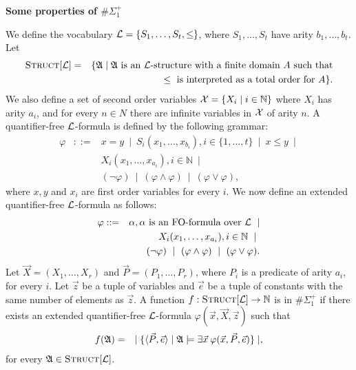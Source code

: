 \documentclass[12pt]{article}
\def\A{{\frak A}}
\def\L{{\cal L}}
\def\N{\mathbb{N}}
\def\P{\vec{P}}
\def\X{\vec{X}}
\def\e{\vec{e}} %
\def\x{\vec{x}} %
\def\z{\vec{z}} %
\begin{document}
\begin{center}
{ \LARGE \bf
  Some properties of $\#\Sigma_1^{+}$
}
\end{center}

We define the vocabulary $\L = \{ S_1,\dots,S_t, \leq \}$, where $S_1,\dots,S_t$ have arity $b_1,\dots,b_t$. Let
\begin{eqnarray*}
\textsc{Struct}[\L] &=& \{\A \mid \A \text{ is an } \L \text{-structure with a finite domain } A \text{ such that} \\
&& \leq \text{ is interpreted as a total order for } A \}.
\end{eqnarray*}
We also define a set of second order variables ${\cal X} = \{ X_i \mid i\in\N \}$ where $X_i$ has arity $a_i$, and for every $n \in N$ there are infinite variables in ${\cal X}$ of arity $n$. A quantifier-free $\L$-formula is defined by the following grammar:
\begin{eqnarray*}
\varphi &::=& x = y \ \mid \ S_i(x_1,\dots,x_{b_i}), i \in \{1,\dots,t\} \ \mid \ x \leq y \ \mid \\
&& X_i(x_1,\dots,x_{a_i}), i\in\N \ \mid \\ 
&& (\neg \varphi) \ \mid \ (\varphi \wedge \varphi) \ \mid \ (\varphi \vee \varphi),
\end{eqnarray*}
where $x,y$ and $x_i$ are first order variables for every $i$. We now define an extended quantifier-free $\L$-formula as follows:
\begin{eqnarray*}
\varphi &::=& \alpha, \alpha \text{ is an FO-formula over } \L  \ \mid \\
&& X_i(x_1,\dots,x_{a_i}), i\in\N \ \mid \ \\
&& (\neg \varphi) \ \mid \ (\varphi \wedge \varphi) \ \mid \ (\varphi \vee \varphi).
\end{eqnarray*}
Let $\X = (X_1,\dots,X_r)$ and $\P = (P_1,\dots,P_r)$, where $P_i$ is a predicate of arity $a_i$, for every $i$. Let $\z$ be a tuple of variables and $\e$ be a tuple of constants with the same number of elements as $\z$. A function $f:\textsc{Struct}[\L] \to \mathbb{N}$ is in $\#\Sigma_1^+$ if there exists an extended quantifier-free $\L$-formula $\varphi(\x,\X,\z)$ such that
\begin{eqnarray*}
f(\A) &=& \mid \{ \langle \P, \e \rangle \mid \A \models \exists \x \: \varphi(\x,\P,\e) \} \mid,
\end{eqnarray*}
for every $\A \in \textsc{Struct}[\L]$.\\
\end{document}
